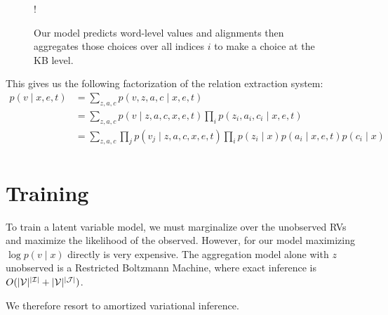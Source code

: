 \documentclass[12pt]{article}
\begin{document}
\begin{figure}[h]
\begin{center}
\resizebox {.3\columnwidth} {!} {
} %
\end{center}
\caption{Our model predicts word-level values and alignments
then aggregates those choices over all indices $i$ to
make a choice at the KB level.
}
\label{fig:infmodel}
\end{figure}

This gives us the following factorization of the relation extraction system:
\begin{equation}
\label{eqn:prob}
\begin{aligned}
p(v \mid x,e,t) &= \sum_{z,a,c} p(v,z,a,c\mid x,e,t)\\
&= \sum_{z,a,c} p(v\mid z,a,c,x,e,t) \prod_i p(z_i, a_i, c_i\mid x,e,t)\\
&= \sum_{z,a,c} \prod_j p(v_j\mid z,a,c,x,e,t) \prod_i p(z_i\mid x)p(a_i\mid x,e,t)p(c_i\mid x)\\
\end{aligned}
\end{equation}
\section{Training}
To train a latent variable model, we must marginalize over the unobserved RVs
and maximize the likelihood of the observed.
However, for our model maximizing $\log p(v \mid x)$ directly is very expensive.
The aggregation model alone with $z$ unobserved is a Restricted Boltzmann Machine,
where exact inference is $O(|\mathcal{V}|^{|\mathcal{I}|} + |\mathcal{V}|^{|\mathcal{J}|})$.


We therefore resort to amortized variational inference.
\end{document}
